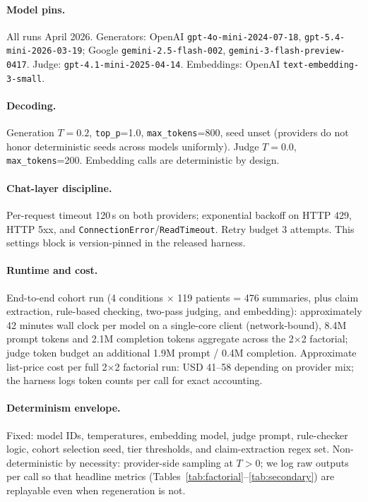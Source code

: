\documentclass{article}
\theoremstyle{plain}
\begin{document}
\paragraph{Model pins.} All runs April 2026. Generators: OpenAI \texttt{gpt-4o-mini-2024-07-18}, \texttt{gpt-5.4-mini-2026-03-19}; Google \texttt{gemini-2.5-flash-002}, \texttt{gemini-3-flash-preview-0417}. Judge: \texttt{gpt-4.1-mini-2025-04-14}. Embeddings: OpenAI \texttt{text-embedding-3-small}.

\paragraph{Decoding.} Generation $T{=}0.2$, \texttt{top\_p}=1.0, \texttt{max\_tokens}=800, seed unset (providers do not honor deterministic seeds across models uniformly). Judge $T{=}0.0$, \texttt{max\_tokens}=200. Embedding calls are deterministic by design.

\paragraph{Chat-layer discipline.} Per-request timeout 120\,s on both providers; exponential backoff on HTTP 429, HTTP 5xx, and \texttt{ConnectionError}/\texttt{ReadTimeout}. Retry budget 3 attempts. This settings block is version-pinned in the released harness.

\paragraph{Runtime and cost.} End-to-end cohort run (4 conditions $\times$ 119 patients = 476 summaries, plus claim extraction, rule-based checking, two-pass judging, and embedding): approximately 42 minutes wall clock per model on a single-core client (network-bound), 8.4M prompt tokens and 2.1M completion tokens aggregate across the 2$\times$2 factorial; judge token budget an additional 1.9M prompt / 0.4M completion. Approximate list-price cost per full 2$\times$2 factorial run: USD 41--58 depending on provider mix; the harness logs token counts per call for exact accounting.

\paragraph{Determinism envelope.} Fixed: model IDs, temperatures, embedding model, judge prompt, rule-checker logic, cohort selection seed, tier thresholds, and claim-extraction regex set. Non-deterministic by necessity: provider-side sampling at $T{>}0$; we log raw outputs per call so that headline metrics (Tables~\ref{tab:factorial}--\ref{tab:secondary}) are replayable even when regeneration is not.
\end{document}
